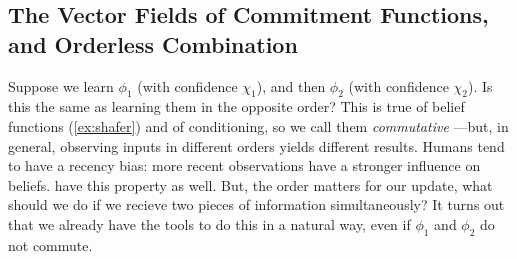 


\subsection{The Vector Fields of Commitment Functions, and Orderless Combination}
\label{sec:vecrep}

Suppose we learn $\phi_1$ (with confidence $\chi_1$), and then $\phi_2$ (with confidence $\chi_2$). 
Is this the same as learning them in the opposite order?
This is true of belief functions 
(\cref{ex:shafer}) and of conditioning, so we call them \emph{commutative}%
---but, in general, 
observing inputs in different orders yields different results.
Humans tend to have a recency bias: more recent observations have a stronger influence on beliefs.
 have this property as well.
But, the order matters for our update, what should we do if we recieve two pieces of information simultaneously?
It turns out that we already have the tools to do this in a natural way, even
if $\phi_1$ and $\phi_2$ do not commute.  


